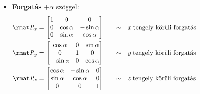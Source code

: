 \documentclass[a4paper, 12pt]{scrartcl}
\begin{document}
\begin{blueBox}
\begin{itemize}
\begin{multicols}{3}
            $$
              \rmat T_{yz} = \begin{bmatrix}
                0 & 0 & 0 \\
                0 & 1 & 0 \\
                0 & 0 & 1
              \end{bmatrix}
              \phantom{= \rmat T_{yz}}
            $$
            $yz$ síkra vetítés

            $$
              \rmat T_{xz} = \begin{bmatrix}
                1 & 0 & 0 \\
                0 & 0 & 0 \\
                0 & 0 & 1
              \end{bmatrix}
              \phantom{= \rmat T_{xz}}
            $$
            $xz$ síkra vetítés
          \end{multicols}

    \item \textbf{Forgatás} $+\alpha$ szöggel:
          \begin{alignat*}{9}
            \rmat R_{x}
             & = \begin{bmatrix}
                   1 & 0           & 0            \\
                   0 & \cos \alpha & -\sin \alpha \\
                   0 & \sin \alpha & \cos \alpha
                 \end{bmatrix}
             & \quad \sim \quad
             & \text{$x$ tengely körüli forgatás} \hspace{3.5cm}
            \\
            \rmat R_{y}
             & = \begin{bmatrix}
                   \cos \alpha  & 0 & \sin \alpha \\
                   0            & 1 & 0           \\
                   -\sin \alpha & 0 & \cos \alpha
                 \end{bmatrix}
             & \quad \sim \quad
             & \text{$y$ tengely körüli forgatás}
            \\
            \rmat R_{z}
             & = \begin{bmatrix}
                   \cos \alpha & -\sin \alpha & 0 \\
                   \sin \alpha & \cos \alpha  & 0 \\
                   0           & 0            & 1
                 \end{bmatrix}
             & \quad \sim \quad
             & \text{$z$ tengely körüli forgatás}
          \end{alignat*}
  \end{itemize}
\end{blueBox}
\end{document}
